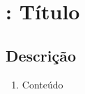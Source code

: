 \section{: Título}
    \subsection*{Descrição}
        \begin{enumerate}
            \item Conteúdo
        \end{enumerate}        
        
